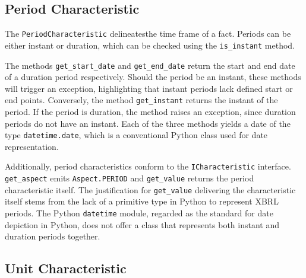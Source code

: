 \subsection{Period Characteristic}

The \texttt{PeriodCharacteristic} delineatesthe time frame of a fact.
Periods can be either instant or duration, which can be checked using the \texttt{is\_instant} method.

The methods \texttt{get\_start\_date} and \texttt{get\_end\_date} return the start and end date of a duration period respectively.
Should the period be an instant, these methods will trigger an exception, highlighting that instant periods lack defined start or end points.
Conversely, the method \texttt{get\_instant} returns the instant of the period.
If the period is duration, the method raises an exception, since duration periods do not have an instant.
Each of the three methods yields a date of the type \texttt{datetime.date}, which is a conventional Python class used for date representation.

Additionally, period characteristics conform to the \texttt{ICharacteristic} interface. 
\texttt{get\_aspect} emits \texttt{Aspect.PERIOD} and \texttt{get\_value} returns the period characteristic itself. 
The justification for \texttt{get\_value} delivering the characteristic itself stems from the lack of a primitive type in Python to represent XBRL periods. 
The Python \texttt{datetime} module, regarded as the standard for date depiction in Python, 
does not offer a class that represents both instant and duration periods together.

\subsection{Unit Characteristic}

